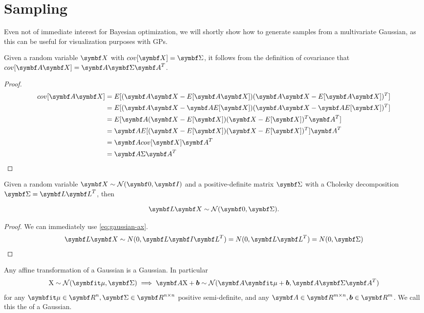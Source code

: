 \section{Sampling}

Even not of immediate interest for Bayesian optimization, we will shortly show
how to generate samples from a multivariate Gaussian, as this can be useful for
visualization purposes with GPs.

\begin{thm}
  Given a random variable $\mX$ with $cov[\mX] = \mSigma$, it follows from
  the definition of covariance that $cov[\mA \mX] = \mA \mSigma \mA^T$.
\end{thm}

\begin{proof}
  \begin{align}
    cov[\mA \mX] &= E[(\mA \mX - E[\mA \mX])(\mA \mX - E[\mA \mX])^T] \\
                 &= E[(\mA \mX - \mA E[\mX])(\mA \mX - \mA E[\mX])^T] \\
                 &= E[\mA (\mX - E[\mX])(\mX - E[\mX])^T \mA^T] \\
                 &= \mA E[(\mX - E[\mX])(\mX - E[\mX])^T] \mA^T \\
                 &= \mA cov[\mX] \mA^T \\
                 &= \mA \Sigma \mA^T
    \label{eq:gaussian-ax}
  \end{align}
\end{proof}

\begin{thm}
  Given a random variable $\mX \sim \gN(\mZero, \mI)$ and a positive-definite matrix
  $\mSigma$ with a Cholesky decomposition $\mSigma = \mL \mL^T$, then

  \begin{equation}
    \mL \mX \sim \gN(\mZero, \mSigma).
    \label{eq:gaussian-cholesky}
  \end{equation}
\end{thm}

\begin{proof}
  We can immediately use \eqref{eq:gaussian-ax}.
  \begin{align}
    \mL \mX \sim N(0, \mL \mI \mL^T) = N(0, \mL \mL^T) = N(0, \mSigma)
  \end{align}
\end{proof}

\begin{thm}
  Any affine transformation of a Gaussian is a Gaussian. In particular
  $$
    \rX \sim \gN(\vmu, \mSigma) \implies \mA \rX + \vb \sim \gN(\mA \vmu + \vb, \mA \mSigma \mA^T)
  $$
  for any $\vmu \in \mR^n, \mSigma \in \mR^{n \times n}$ positive
  semi-definite, and any $\mA \in \mR^{m \times n}, \vb \in \mR^m$.
  We call this the  of a Gaussian.
\end{thm}

